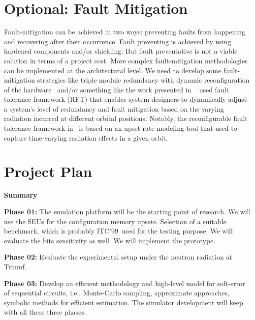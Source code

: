 \section{Optional: Fault Mitigation}
Fault-mitigation can be achieved in two ways: preventing faults from happening and
recovering after their occurrence. Fault preventing is achieved by using hardened components and/or shielding. But fault preventative is not a viable solution in terms of a project cost. More complex fault-mitigation methodologies can be implemented at the architectural level. We need to develop some fault-mitigation strategies like triple module redundancy with  dynamic reconfiguration of the hardware~\cite{jacobs2012reconfigurable} and/or something like the work presented in 
~\cite{jacobs2012reconfigurable} used fault tolerance framework (RFT) that enables system designers to dynamically adjust a system's level of redundancy and fault mitigation based on the varying radiation incurred at different orbital positions. Notably, the reconfigurable fault tolerance framework in~\cite{jacobs2012reconfigurable} is based on an upset rate modeling tool that used to capture time-varying radiation effects in a given orbit.


\section{Project Plan}


\textbf{Summary}

\textbf{Phase  01:} The emulation platform will be the starting point of research. We will use the SEUs for the configuration memory upsets. Selection of a suitable benchmark, which is probably ITC'99~\cite{ITC}used for the testing purpose. We will evaluate the bits sensitivity as well. We will implement the prototype. 

\textbf{Phase  02:} Evaluate the experimental setup under the neutron radiation at Triumf.


\textbf{Phase 03:} Develop an efficient methodology and high-level model for soft-error of sequential circuits, i.e., Monte-Carlo sampling, approximate approaches, symbolic methods for efficient estimation. The simulator development will keep with all these three phases.



